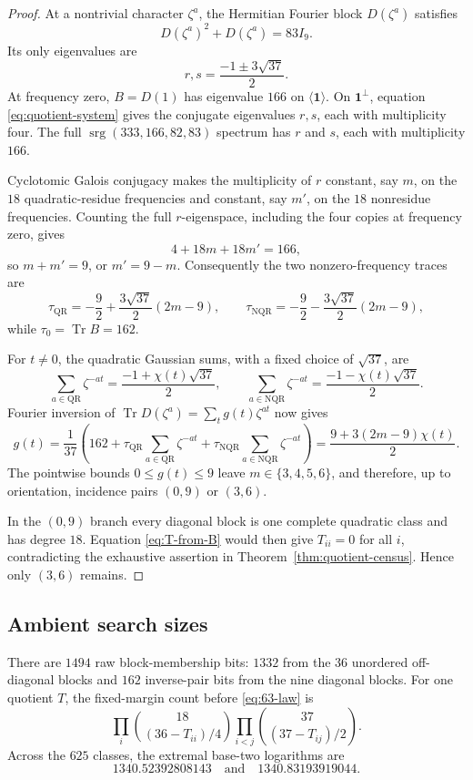 \documentclass[11pt]{article}
\theoremstyle{definition}
\newcommand{\QR}{\mathrm{QR}}
\newcommand{\NQR}{\mathrm{NQR}}
\newcommand{\Tr}{\operatorname{Tr}}
\newcommand{\one}{\mathbf{1}}
\begin{document}
\begin{proof}
At a nontrivial character \(\zeta^a\), the Hermitian Fourier block
\(D(\zeta^a)\) satisfies
\[
 D(\zeta^a)^2+D(\zeta^a)=83I_9.
\]
Its only eigenvalues are
\[
 r,s=\frac{-1\pm3\sqrt{37}}2.
\]
At frequency zero, \(B=D(1)\) has eigenvalue \(166\) on
\(\langle\one\rangle\).  On \(\one^\perp\), equation
\eqref{eq:quotient-system} gives the conjugate eigenvalues \(r,s\), each
with multiplicity four.  The full
\(\operatorname{srg}(333,166,82,83)\) spectrum has \(r\) and \(s\), each
with multiplicity \(166\).

Cyclotomic Galois conjugacy makes the multiplicity of \(r\) constant,
say \(m\), on the \(18\) quadratic-residue frequencies and constant, say
\(m'\), on the \(18\) nonresidue frequencies.  Counting the full
\(r\)-eigenspace, including the four copies at frequency zero, gives
\[
 4+18m+18m'=166,
\]
so \(m+m'=9\), or \(m'=9-m\).  Consequently the two nonzero-frequency
traces are
\[
 \tau_{\QR}=-\frac92+\frac{3\sqrt{37}}2(2m-9),
 \qquad
 \tau_{\NQR}=-\frac92-\frac{3\sqrt{37}}2(2m-9),
\]
while \(\tau_0=\Tr B=162\).

For \(t\neq0\), the quadratic Gaussian sums, with a fixed choice of
\(\sqrt{37}\), are
\[
 \sum_{a\in\QR}\zeta^{-at}
   =\frac{-1+\chi(t)\sqrt{37}}2,
 \qquad
 \sum_{a\in\NQR}\zeta^{-at}
   =\frac{-1-\chi(t)\sqrt{37}}2.
\]
Fourier inversion of
\(\Tr D(\zeta^a)=\sum_tg(t)\zeta^{at}\) now gives
\[
 g(t)=\frac1{37}
 \left(
 162+\tau_{\QR}\sum_{a\in\QR}\zeta^{-at}
     +\tau_{\NQR}\sum_{a\in\NQR}\zeta^{-at}
 \right)
 =\frac{9+3(2m-9)\chi(t)}2.
\tag{4.2}\label{eq:g-formula}
\]
The pointwise bounds \(0\leq g(t)\leq9\) leave
\(m\in\{3,4,5,6\}\), and therefore, up to orientation, incidence pairs
\((0,9)\) or \((3,6)\).

In the \((0,9)\) branch every diagonal block is one complete quadratic
class and has degree \(18\).  Equation \eqref{eq:T-from-B} would then give
\(T_{ii}=0\) for all \(i\), contradicting the exhaustive assertion in
Theorem~\ref{thm:quotient-census}.  Hence only \((3,6)\) remains.
\end{proof}

\subsection{Ambient search sizes}

There are \(1494\) raw block-membership bits: \(1332\) from the \(36\)
unordered off-diagonal blocks and \(162\) inverse-pair bits from the nine
diagonal blocks.  For one quotient \(T\), the fixed-margin count before
\eqref{eq:63-law} is
\[
 \prod_i
 \binom{18}{(36-T_{ii})/4}
 \prod_{i<j}
 \binom{37}{(37-T_{ij})/2}.
\tag{4.3}\label{eq:margin-count}
\]
Across the \(625\) classes, the extremal base-two logarithms are
\[
1340.52392808143
\quad\text{and}\quad
1340.83193919044.
\]
\end{document}
